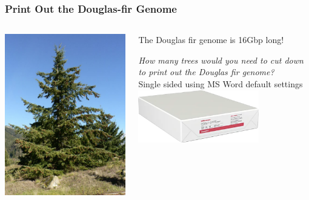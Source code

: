 \documentclass{beamer}
\begin{document}
\begin{frame}
	\frametitle{Print Out the Douglas-fir Genome}
	\begin{columns}
		\begin{column}{0.4\textwidth}
						\centering	\includegraphics[keepaspectratio, width  =\textwidth]{img/doug-fir}\\
		\end{column}
		\begin{column}{0.6\textwidth}

\centering
The Douglas fir genome is 16Gbp long!\\
\vspace{20pt}

\textit{How many trees would you need to cut down to print out the Douglas fir genome?}\\
\vspace{20pt}
Single sided using MS Word default settings \\
\vspace{10pt}
						\centering	\includegraphics[keepaspectratio, width  =0.7\textwidth]{img/reamOpaper}\\


\end{column}
\end{columns}
\end{frame}
\end{document}
